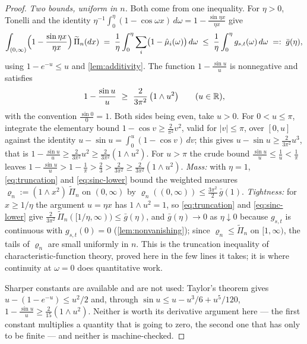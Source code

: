 \begin{proof}
\emph{Two bounds, uniform in $n$.} Both come from one inequality. For $\eta > 0$, Tonelli and
the identity $\eta^{-1}\int_0^\eta (1 - \cos\omega x)\,d\omega = 1 - \frac{\sin\eta x}{\eta x}$
give
\begin{equation}\label{eq:truncation}
  \int_{(0,\infty)} \Bigl(1 - \frac{\sin\eta x}{\eta x}\Bigr)\,\widetilde\Pi_n(dx)
  \;=\; \frac1\eta\int_0^\eta \sum_i\bigl(1 - \hat\mu_i(\omega)\bigr)\,d\omega
  \;\le\; \frac1\eta\int_0^\eta g_{s,t}(\omega)\,d\omega \;=:\; \bar g(\eta),
\end{equation}
using $1 - e^{-u} \le u$ and \ref{lem:additivity}. The function $1 - \frac{\sin u}{u}$ is
nonnegative and satisfies
\begin{equation}\label{eq:sinc-lower}
  1 - \frac{\sin u}{u} \ \ge\ \frac{2}{3\pi^2}\,\bigl(1 \wedge u^2\bigr)
  \qquad (u \in \mathbb{R}),
\end{equation}
with the convention $\frac{\sin 0}{0} = 1$. Both sides being even, take $u > 0$. For
$0 < u \le \pi$, integrate the elementary bound $1 - \cos v \ge \frac{2}{\pi^2}v^2$, valid for
$|v| \le \pi$, over $[0,u]$ against the identity $u - \sin u = \int_0^u (1 - \cos v)\,dv$; this
gives $u - \sin u \ge \frac{2}{3\pi^2}u^3$, that is
$1 - \frac{\sin u}{u} \ge \frac{2}{3\pi^2}u^2 \ge \frac{2}{3\pi^2}(1 \wedge u^2)$. For
$u > \pi$ the crude bound $\frac{\sin u}{u} \le \frac1u < \frac1\pi$ leaves
$1 - \frac{\sin u}{u} > 1 - \frac1\pi > \frac23 > \frac{2}{3\pi^2} \ge
\frac{2}{3\pi^2}(1 \wedge u^2)$. \emph{Mass:} with $\eta = 1$, \ref{eq:truncation} and
\ref{eq:sinc-lower} bound the weighted measures
$\varrho_n := (1 \wedge x^2)\,\widetilde\Pi_n$ on $(0,\infty)$ by
$\varrho_n((0,\infty)) \le \tfrac{3\pi^2}{2}\,\bar g(1)$. \emph{Tightness:} for $x \ge 1/\eta$
the argument $u = \eta x$ has $1 \wedge u^2 = 1$, so \ref{eq:truncation} and
\ref{eq:sinc-lower} give
$\tfrac{2}{3\pi^2}\,\widetilde\Pi_n([1/\eta,\infty)) \le \bar g(\eta)$, and
$\bar g(\eta) \to 0$ as $\eta \downarrow 0$ because $g_{s,t}$ is continuous with
$g_{s,t}(0) = 0$ (\ref{lem:nonvanishing}); since $\varrho_n \le \widetilde\Pi_n$ on
$[1,\infty)$, the tails of $\varrho_n$ are small uniformly in $n$. This is the truncation
inequality of characteristic-function theory, proved here in the few lines it takes; it is
where continuity at $\omega = 0$ does quantitative work.

Sharper constants are available and are not used: Taylor's theorem gives
$u - (1 - e^{-u}) \le u^2/2$ and, through $\sin u \le u - u^3/6 + u^5/120$,
$1 - \frac{\sin u}{u} \ge \frac{2}{15}(1 \wedge u^2)$. Neither is worth its derivative
argument here --- the first constant multiplies a quantity that is going to zero, the second
one that has only to be finite --- and neither is machine-checked.


\end{proof}
